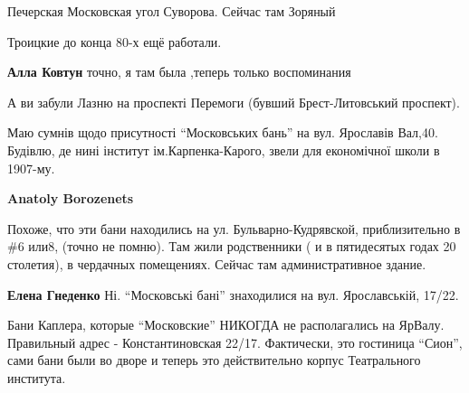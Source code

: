 \begin{itemize}
Печерская Московская угол Суворова. Сейчас там Зоряный

Троицкие до конца 80-х ещё работали.

\textbf{Алла Ковтун} точно, я там была ,теперь только воспоминания

А ви забули Лазню на проспекті Перемоги (бувший Брест-Литовський проспект).


Маю сумнів щодо присутності \enquote{Московських бань} на вул. Ярославів Вал,40.
Будівлю, де нині інститут ім.Карпенка-Карого, звели для економічної школи в
1907-му.

\begin{itemize} %
\textbf{Anatoly Borozenets} 

Похоже, что эти бани находились на ул. Бульварно-Кудрявской, приблизительно в
\#6 или8, (точно не помню). Там жили родственники ( и в пятидесятых годах 20
столетия), в чердачных помещениях. Сейчас там административное здание.


\textbf{Елена Гнеденко} Ні. \enquote{Московські бані} знаходилися на вул. Ярославській, 17/22.
\end{itemize} %


Бани Каплера, которые \enquote{Московские} НИКОГДА не располагались на ЯрВалу.
Правильный адрес - Константиновская 22/17. Фактически, это гостиница \enquote{Сион},
сами бани были во дворе и теперь это действительно корпус Театрального
института.

\end{itemize} %
